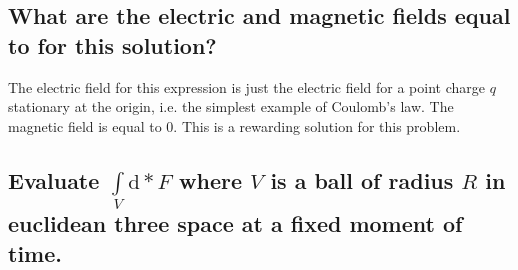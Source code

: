 \subsection{What are the electric and magnetic fields equal to for this solution?}
The electric field for this expression is just the electric field for a point charge $q$ stationary at the origin, i.e. the simplest example of Coulomb's law. The magnetic field is equal to $0$. This is a rewarding solution for this problem. 

\subsection{Evaluate $ \int\limits_{V} \textrm{d} \ast F $ where $V$ is a ball of radius $R$ in euclidean three space at a fixed moment of time.}
